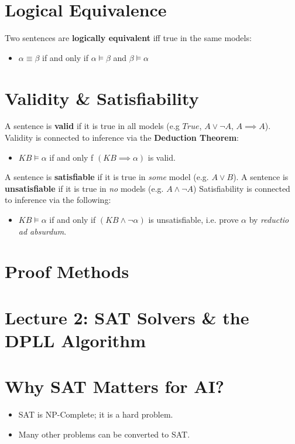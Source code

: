 \documentclass[11pt]{article}
\begin{document}
\section{Logical Equivalence}
\label{sec:org06d2780}
Two sentences are \textbf{logically equivalent} iff true in the same models:
\begin{itemize}
\item \(\alpha \equiv \beta\) if and only if \(\alpha \models \beta\) and \(\beta \models \alpha\)
\end{itemize}

\section{Validity \& Satisfiability}
\label{sec:orge996c99}
A sentence is \textbf{valid} if it is true in all models (e.g \(True\), \(A\lor\neg A\), \(A\implies A\)).
Validity is connected to inference via the \textbf{Deduction Theorem}:
\begin{itemize}
\item \(KB \models \alpha\) if and only f \((KB \implies \alpha)\) is valid.
\end{itemize}
A sentence is \textbf{satisfiable} if it is true in \emph{some} model (e.g. \(A\lor B\)).
A sentence is \textbf{unsatisfiable} if it is true in \emph{no} models (e.g. \(A\land \neg A\))
Satisfiability is connected to inference via the following:
\begin{itemize}
\item \(KB \models \alpha\) if and only if \((KB \land \neg \alpha)\) is unsatisfiable, i.e. prove \(\alpha\) by \emph{reductio ad absurdum}.
\end{itemize}

\section{Proof Methods}
\label{sec:org12fc565}

\section{Lecture 2: SAT Solvers \& the DPLL Algorithm}
\maketitle
\tableofcontents


\section{Why SAT Matters for AI?}
\label{sec:org796256c}
\begin{itemize}
\item SAT is NP-Complete; it is a hard problem.
\item Many other problems can be converted to SAT.
\end{itemize}
\end{document}
